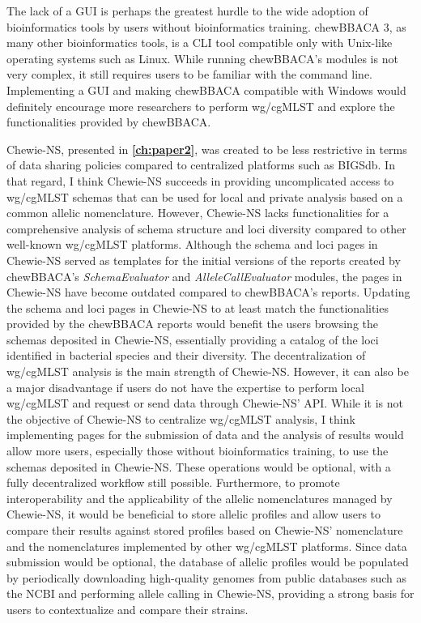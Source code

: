 The lack of a \ac{GUI} is perhaps the greatest hurdle to the wide adoption of bioinformatics tools by users without bioinformatics training. chewBBACA 3, as many other bioinformatics tools, is a \ac{CLI} tool compatible only with Unix-like operating systems such as Linux. While running chewBBACA's modules is not very complex, it still requires users to be familiar with the command line. Implementing a \ac{GUI} and making chewBBACA compatible with Windows would definitely encourage more researchers to perform \ac{wg/cgMLST} and explore the functionalities provided by chewBBACA.

\ac{Chewie-NS}, presented in \textbf{\autoref{ch:paper2}}, was created to be less restrictive in terms of data sharing policies compared to centralized platforms such as \ac{BIGSdb}. In that regard, I think \ac{Chewie-NS} succeeds in providing uncomplicated access to \ac{wg/cgMLST} schemas that can be used for local and private analysis based on a common allelic nomenclature. However, \ac{Chewie-NS} lacks functionalities for a comprehensive analysis of schema structure and loci diversity compared to other well-known \ac{wg/cgMLST} platforms. Although the schema and loci pages in \ac{Chewie-NS} served as templates for the initial versions of the reports created by chewBBACA's \textit{SchemaEvaluator} and \textit{AlleleCallEvaluator} modules, the pages in \ac{Chewie-NS} have become outdated compared to chewBBACA's reports. Updating the schema and loci pages in \ac{Chewie-NS} to at least match the functionalities provided by the chewBBACA reports would benefit the users browsing the schemas deposited in \ac{Chewie-NS}, essentially providing a catalog of the loci identified in bacterial species and their diversity. The decentralization of \ac{wg/cgMLST} analysis is the main strength of \ac{Chewie-NS}. However, it can also be a major disadvantage if users do not have the expertise to perform local \ac{wg/cgMLST} and request or send data through \ac{Chewie-NS}' \ac{API}. While it is not the objective of \ac{Chewie-NS} to centralize \ac{wg/cgMLST} analysis, I think implementing pages for the submission of data and the analysis of results would allow more users, especially those without bioinformatics training, to use the schemas deposited in \ac{Chewie-NS}. These operations would be optional, with a fully decentralized workflow still possible. Furthermore, to promote interoperability and the applicability of the allelic nomenclatures managed by \ac{Chewie-NS}, it would be beneficial to store allelic profiles and allow users to compare their results against stored profiles based on \ac{Chewie-NS}' nomenclature and the nomenclatures implemented by other \ac{wg/cgMLST} platforms. Since data submission would be optional, the database of allelic profiles would be populated by periodically downloading high-quality genomes from public databases such as the \ac{NCBI} and performing allele calling in \ac{Chewie-NS}, providing a strong basis for users to contextualize and compare their strains.

